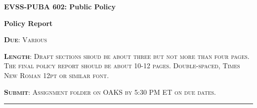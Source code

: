 \documentclass[11pt]{article}
\begin{document}
\begin{center}
\bigskip

{\bf{EVSS-PUBA 602: Public Policy}}

{\bf{Policy Report}}
\end{center} 

\noindent \textsc{{\bf{Due}}: Various}

\noindent \textsc{{\bf{Length}}: Draft sections shoud be about three but not more than four pages. The final policy report should be about 10-12 pages. Double-spaced, Times New Roman 12pt or similar font.}

\noindent \textsc{{\bf{Submit}}: Assignment folder on OAKS by 5:30 PM ET on due dates.}


\noindent\rule{\textwidth}{1pt}





  
\end{document}
